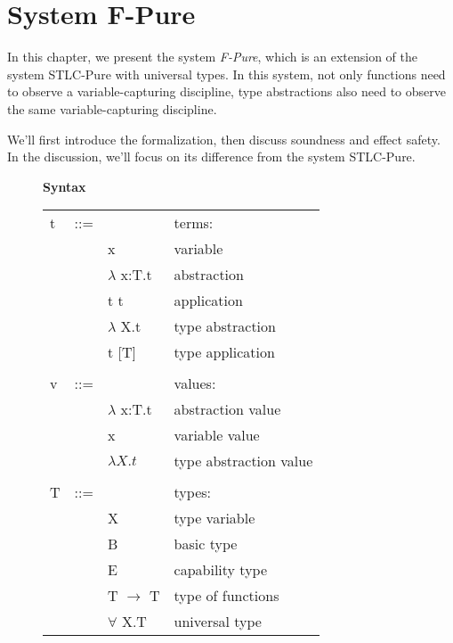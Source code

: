 \section{System F-Pure}

In this chapter, we present the system \emph{F-Pure}, which is an
extension of the system STLC-Pure with universal types. In this
system, not only functions need to observe a variable-capturing
discipline, type abstractions also need to observe the same
variable-capturing discipline.

We'll first introduce the formalization, then discuss soundness and
effect safety. In the discussion, we'll focus on its difference from
the system STLC-Pure.

\begin{figure}
\begin{framed}

\setlength{\columnseprule}{0.4pt}
\begin{multicols}{2}

\textbf{Syntax}

\begin{tabu} to \linewidth {l l l X[r]}
  t   & ::= &                                      & terms:               \\
      &     &  x                                   & variable             \\
      &     & $\lambda$ x:T.t                      & abstraction          \\
      &     & t t                                  & application          \\
      &     & \colorbox{shade}{$\lambda$ X.t}      & type abstraction     \\
      &     & \colorbox{shade}{t [T]}              & type application     \\
\\
  v   & ::= &                    & values:              \\
      &     & $\lambda$ x:T.t    & abstraction value    \\
      &     & x                  & variable value       \\
      &     & \colorbox{shade}{$\lambda X.t$}    & type abstraction value  \\
\\
  T   & ::= &                       & types:               \\
      &     & \colorbox{shade}{X}   & type variable        \\
      &     & B                     & basic type           \\
      &     & E                     & capability type      \\
      &     & T $\to$ T             & type of functions    \\
      &     & \colorbox{shade}{$\forall$ X.T} & universal type       \\
\end{tabu}


\end{multicols}
\end{framed}
\end{figure}
